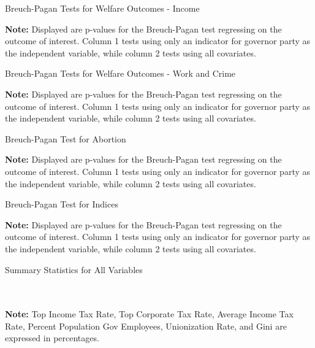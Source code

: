 \documentclass{article}
\begin{document}
\begin{table}[!hbtp]
\caption{Breuch-Pagan Tests for Welfare Outcomes - Income}

\textbf{Note:} Displayed are p-values for the Breuch-Pagan test regressing on the outcome of interest. Column 1 tests using only an indicator for governor party as the independent variable, while column 2 tests using all covariates. 
\label{table:bp_welfare1}
\end{table}

\begin{table}[!hbtp]
\caption{Breuch-Pagan Tests for Welfare Outcomes - Work and Crime}

\textbf{Note:} Displayed are p-values for the Breuch-Pagan test regressing on the outcome of interest. Column 1 tests using only an indicator for governor party as the independent variable, while column 2 tests using all covariates. 
\label{table:bp_welfare2}
\end{table}

\begin{table}[!hbtp]
\caption{Breuch-Pagan Test for Abortion}

\textbf{Note:} Displayed are p-values for the Breuch-Pagan test regressing on the outcome of interest. Column 1 tests using only an indicator for governor party as the independent variable, while column 2 tests using all covariates. 
\label{table:bp_abortion}
\end{table}

\begin{table}[!hbtp]
\caption{Breuch-Pagan Test for Indices}

\textbf{Note:} Displayed are p-values for the Breuch-Pagan test regressing on the outcome of interest. Column 1 tests using only an indicator for governor party as the independent variable, while column 2 tests using all covariates. 
\label{table:bp_index}
\end{table}


\begin{table}[!hbtp]
\caption{Summary Statistics for All Variables}

\\ \\
\textbf{Note:}  Top Income Tax Rate, Top Corporate Tax Rate, Average Income Tax Rate, Percent Population  Gov Employees, Unionization Rate, and Gini are expressed in percentages.
\label{table:summary_long}
\end{table}
\end{document}
